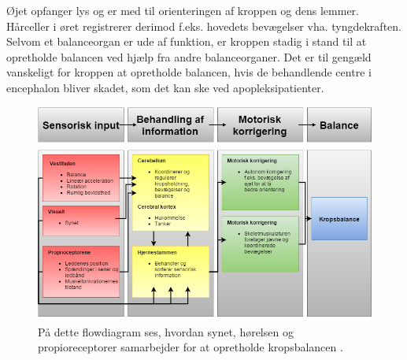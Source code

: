 Øjet opfanger lys og er med til orienteringen af kroppen og dens lemmer. Hårceller i øret registrerer derimod f.eks. hovedets bevægelser vha. tyngdekraften. Selvom et balanceorgan er ude af funktion, er kroppen stadig i stand til at opretholde balancen ved hjælp fra andre balanceorganer. Det er til gengæld vanskeligt for kroppen at opretholde balancen, hvis de behandlende centre i encephalon bliver skadet, som det kan ske ved apopleksipatienter. \cite{Martini2012} \\
\begin{figure}[H]
	\centering
	\includegraphics[scale=0.48]{figures/bProblemanalyse/Balance-Flowdiagram.png}
	\caption{På dette flowdiagram ses, hvordan synet, hørelsen og propioreceptorer samarbejder for at opretholde kropsbalancen \cite{watson2015}.}
	\label{flowbalance}
\end{figure}




